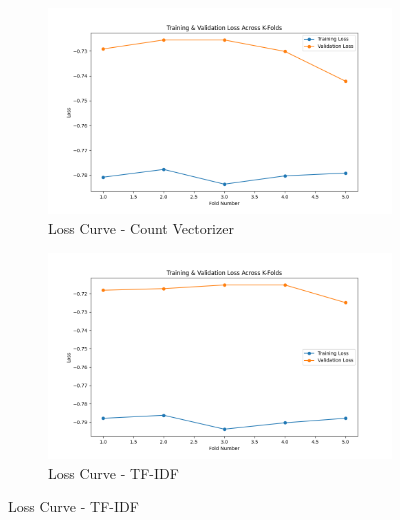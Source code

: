\begin{figure}[H]
    \centering
    \begin{subfigure}[b]{0.48\textwidth}
        \includegraphics[width=\textwidth]{img/report_info/img/1.3.XGB/best_xgboost_count_loss.png}
        \caption{Loss Curve - Count Vectorizer}
        \label{fig:lr-count-loss}
    \end{subfigure}
    \begin{subfigure}[b]{0.48\textwidth}
        \includegraphics[width=\textwidth]{img/report_info/img/1.3.XGB/best_xgboost_tfidf_loss.png}
        \caption{Loss Curve - TF-IDF}
        \label{fig:lr-tfidf-loss}
    \end{subfigure}
    

\end{figure}
